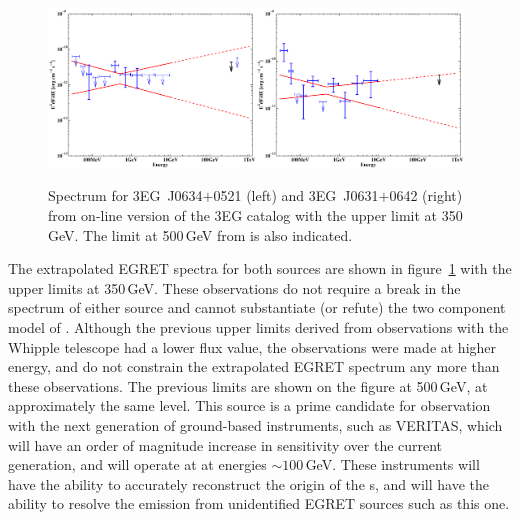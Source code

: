\begin{figure}[p]
\includegraphics[angle=270,width=0.49\textwidth]{plots/chap-observations/spectra/3EG_J0634+0521.pdf}\hspace*{\fill}\includegraphics[angle=270,width=0.49\textwidth]{plots/chap-observations/spectra/3EG_J0631+0642.pdf}
\caption{\label{FIG::OBSERVATIONS::J0634SPEC} Spectrum for 
3EG~J0634$+$0521 (left) and 3EG~J0631$+$0642 (right) from on-line
version of the 3EG catalog with the upper limit at 350\,GeV. The limit
at 500\,GeV from \citet{REF::LESSARD::ICRC1999} is also indicated.}
\end{figure}

The extrapolated EGRET spectra for both sources are shown in
figure~\ref{FIG::OBSERVATIONS::J0634SPEC} with the upper limits at
350\,GeV. These observations do not require a break in the spectrum of
either source and cannot substantiate (or refute) the two component
model of \citet{REF::TORRES::PR2003}. Although the previous upper
limits derived from observations with the Whipple telescope
\citep{REF::LESSARD::ICRC1999} had a lower flux value, the
observations were made at higher energy, and do not constrain the
extrapolated EGRET spectrum any more than these observations. The
previous limits are shown on the figure at 500\,GeV, at approximately
the same level. This source is a prime candidate for observation with
the next generation of ground-based instruments, such as VERITAS,
which will have an order of magnitude increase in sensitivity over the
current generation, and will operate at at energies
$\sim100$\,GeV. These instruments will have the ability to accurately
reconstruct the origin of the {\Grayc}s, and will have the ability to
resolve the \Gray emission from unidentified EGRET sources such as
this one.

